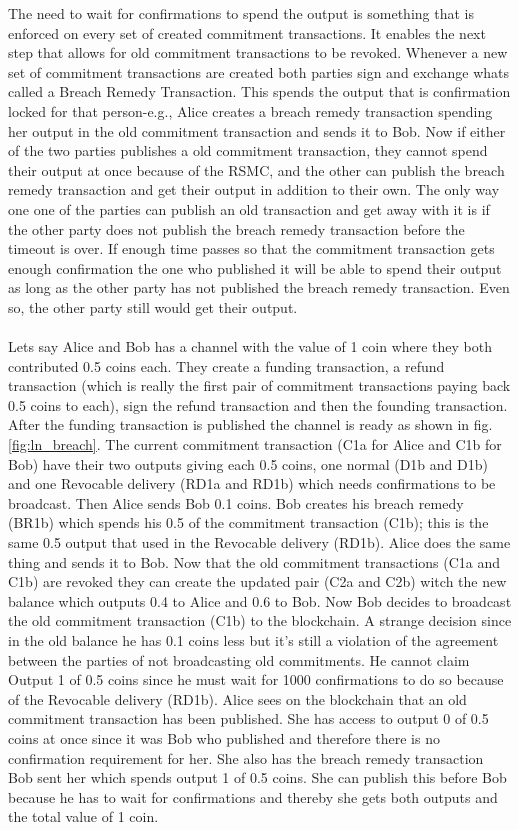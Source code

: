 \documentclass[informationsecurity]{gucmasterproject}
\begin{document}
The need to wait for confirmations to spend the output is something that is enforced on every set of created commitment transactions. It enables the next step that allows for old commitment transactions to be revoked. Whenever a new set of commitment transactions are created both parties sign and exchange whats called a Breach Remedy Transaction. This spends the output that is confirmation locked for that person-e.g., Alice creates a breach remedy transaction spending her output in the old commitment transaction and sends it to Bob. Now if either of the two parties publishes a old commitment transaction, they cannot spend their output at once because of the RSMC, and the other can publish the breach remedy transaction and get their output in addition to their own. The only way one one of the parties can publish an old transaction and get away with it is if the other party does not publish the breach remedy transaction before the timeout is over. If enough time passes so that the commitment transaction gets enough confirmation the one who published it will be able to spend their output as long as the other party has not published the breach remedy transaction. Even so, the other party still would get their output.

\paragraph{}
Lets say Alice and Bob has a channel with the value of 1 coin where they both contributed 0.5 coins each. They create a funding transaction, a refund transaction (which is really the first pair of commitment transactions paying back 0.5 coins to each), sign the refund transaction and then the founding transaction. After the funding transaction is published the channel is ready as shown in fig.\ref{fig:ln_breach}. The current commitment transaction (C1a for Alice and C1b for Bob) have their two outputs giving each 0.5 coins, one normal (D1b and D1b) and one Revocable delivery (RD1a and RD1b) which needs confirmations to be broadcast. Then Alice sends Bob 0.1 coins. Bob creates his breach remedy (BR1b) which spends his 0.5 of the commitment transaction (C1b); this is the same 0.5 output that used in the Revocable delivery (RD1b).
Alice does the same thing and sends it to Bob. Now that the old commitment transactions (C1a and C1b) are revoked they can create the updated pair (C2a and C2b) witch the new balance which outputs 0.4 to Alice and 0.6 to Bob. Now Bob decides to broadcast the old commitment transaction (C1b) to the blockchain. A strange decision since in the old balance he has 0.1 coins less but it's still a violation of the agreement between the parties of not broadcasting old commitments. 
He cannot claim Output 1 of 0.5 coins since he must wait for 1000 confirmations to do so because of the Revocable delivery (RD1b).
Alice sees on the blockchain that an old commitment transaction has been published. She has access to output 0 of 0.5 coins at once since it was Bob who published and therefore there is no confirmation requirement for her. She also has the breach remedy transaction Bob sent her which spends output 1 of 0.5 coins. She can publish this before Bob because he has to wait for confirmations and thereby she gets both outputs and the total value of 1 coin.
\end{document}
